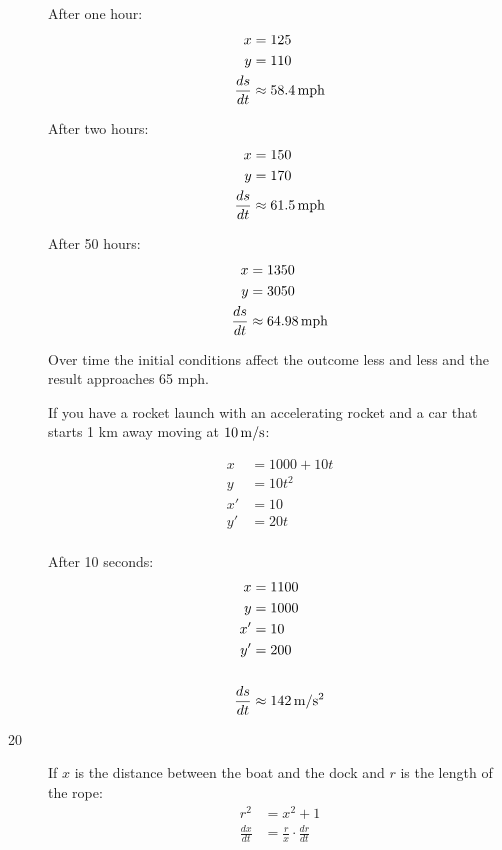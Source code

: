 \documentclass[letterpaper, landscape]{exam}
\begin{document}
\begin{description}
      After one hour:
      \begin{align*}
        x             & = 125 \\
        y             & = 110 \\
        \frac{ds}{dt} & \approx \unit[58.4]{mph}
      \end{align*}

      After two hours:
      \begin{align*}
        x             & = 150 \\
        y             & = 170 \\
        \frac{ds}{dt} & \approx \unit[61.5]{mph}
      \end{align*}

      After 50 hours:
      \begin{align*}
        x             & = 1350 \\
        y             & = 3050 \\
        \frac{ds}{dt} & \approx \unit[64.98]{mph}
      \end{align*}

      Over time the initial conditions affect the outcome less and less and the result approaches 
      65 mph.

      \newpage 

      If you have a rocket launch with an accelerating rocket and a car that starts 1 km away moving
      at $\unit[10]{m/s}$: 

      \begin{align*}
        x  & = 1000 + 10t \\
        y  & = 10t^2 \\
        x' & = 10 \\
        y' & = 20t \\
      \end{align*}

      After 10 seconds:
      \begin{align*}
        x  & = 1100 \\
        y  & = 1000 \\
        x' & = 10 \\
        y' & = 200 \\
        \\
        \frac{ds}{dt} &\approx \unit[142]{m/s^2} \\
      \end{align*}

    \item[20]
      If $x$ is the distance between the boat and the dock and $r$ is the length of the rope:
      \begin{align*}
        r^2           & = x^2 + 1 \\
        \frac{dx}{dt} & = \frac{r}{x} \cdot \frac{dr}{dt} \\
      \end{align*}


\end{description}
\end{document}
